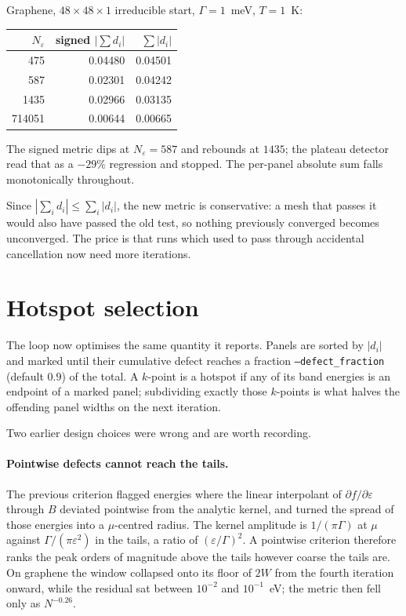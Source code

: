 \documentclass[11pt,a4paper]{article}
\newcommand{\dfda}{\partial f/\partial\varepsilon}
\newcommand{\code}[1]{\texttt{#1}}
\begin{document}
Graphene, $48\times48\times1$ irreducible start, $\Gamma=1$~meV, $T=1$~K:

\begin{center}
\begin{tabular}{rrr}
\toprule
$N_\varepsilon$ & signed $\left|\sum d_i\right|$ & $\sum\left|d_i\right|$ \\
\midrule
     475 & 0.04480 & 0.04501 \\
     587 & 0.02301 & 0.04242 \\
    1435 & 0.02966 & 0.03135 \\
  714051 & 0.00644 & 0.00665 \\
\bottomrule
\end{tabular}
\end{center}

\noindent
The signed metric dips at $N_\varepsilon=587$ and rebounds at $1435$; the
plateau detector read that as a $-29\%$ regression and stopped. The
per-panel absolute sum falls monotonically throughout.

Since $\left|\sum_i d_i\right|\le\sum_i\left|d_i\right|$, the new metric is
conservative: a mesh that passes it would also have passed the old test, so
nothing previously converged becomes unconverged. The price is that runs which
used to pass through accidental cancellation now need more iterations.

\section{Hotspot selection}
\label{sec:selection}

The loop now optimises the same quantity it reports. Panels are sorted by
$|d_i|$ and marked until their cumulative defect reaches a fraction
\code{--defect\_fraction} (default $0.9$) of the total. A $k$-point is a
hotspot if any of its band energies is an endpoint of a marked panel;
subdividing exactly those $k$-points is what halves the offending panel widths
on the next iteration.

Two earlier design choices were wrong and are worth recording.

\paragraph{Pointwise defects cannot reach the tails.}
The previous criterion flagged energies where the linear interpolant of
$\dfda$ through $B$ deviated pointwise from the analytic kernel, and turned
the spread of those energies into a $\mu$-centred radius. The kernel amplitude
is $1/(\pi\Gamma)$ at $\mu$ against $\Gamma/(\pi\varepsilon^2)$ in the tails, a
ratio of $(\varepsilon/\Gamma)^2$. A pointwise criterion therefore ranks the
peak orders of magnitude above the tails however coarse the tails are. On
graphene the window collapsed onto its floor of $2W$ from the fourth iteration
onward, while the residual sat between $10^{-2}$ and $10^{-1}$~eV; the metric
then fell only as $N^{-0.26}$.
\end{document}
